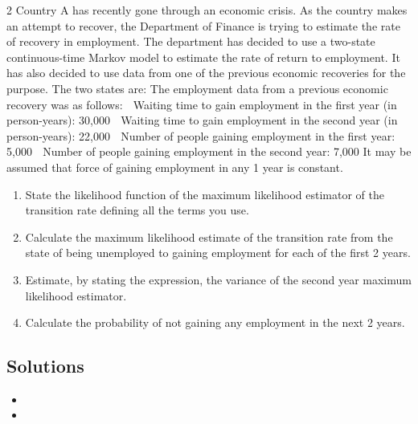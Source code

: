\documentclass[a4paper,12pt]{article}
\begin{document}


2 Country A has recently gone through an economic crisis. As the country makes an
attempt to recover, the Department of Finance is trying to estimate the rate of
recovery in employment. The department has decided to use a two-state
continuous-time Markov model to estimate the rate of return to employment. It has
also decided to use data from one of the previous economic recoveries for the
purpose. The two states are:
The employment data from a previous economic recovery was as follows:
 Waiting time to gain employment in the first year (in person-years): 30,000
 Waiting time to gain employment in the second year (in person-years): 22,000
 Number of people gaining employment in the first year: 5,000
 Number of people gaining employment in the second year: 7,000
It may be assumed that force of gaining employment in any 1 year is constant.
\begin{enumerate}
\item   State the likelihood function of the maximum likelihood estimator of the
transition rate defining all the terms you use. 
\item   Calculate the maximum likelihood estimate of the transition rate from the state
of being unemployed to gaining employment for each of the first 2 years. 
\item  Estimate, by stating the expression, the variance of the second year maximum
likelihood estimator. 
\item  Calculate the probability of not gaining any employment in the next 2 years.
\end{enumerate}
\subsection*{Solutions}

\begin{itemize}
\item
\item
\end{itemize}
\end{document}
